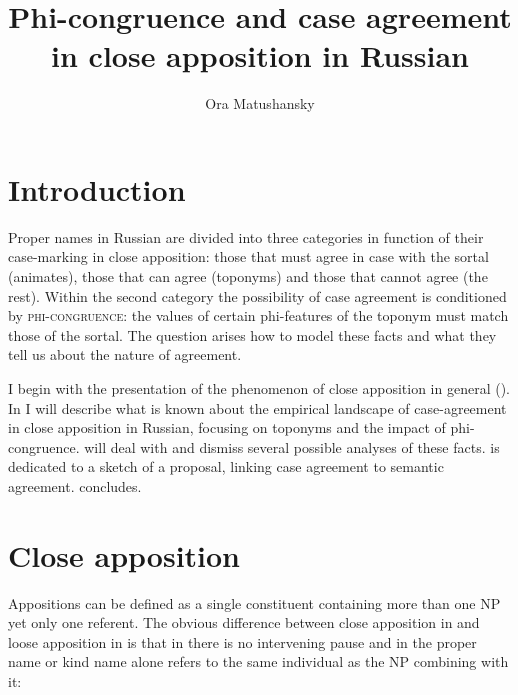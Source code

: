 \documentclass[output=paper,colorlinks,citecolor=brown]{langscibook}
\author{Ora Matushansky\affiliation{SFL (CNRS/Université Paris-8/UPL); ILS (Utrecht University)}\orcid{0000-0002-1420-7091}}
\title{Phi-congruence and case agreement in close apposition in Russian}
\begin{document}
\maketitle


\section{Introduction}\label{mat:sec:intro}

Proper names in Russian are divided into three categories in function of their case-marking in close apposition: those that must agree in case with the sortal (animates), those that can agree (toponyms) and those that cannot agree (the rest). Within the second category the possibility of case agreement is conditioned by \textsc{phi-congruence}: the values of certain phi-features of the toponym must match those of the sortal. The question arises how to model these facts and what they tell us about the nature of agreement.

I begin with the presentation of the phenomenon of close apposition in general (). In  I will describe what is known about the empirical landscape of case-agreement in close apposition in Russian, focusing on toponyms and the impact of phi-congruence.  will deal with and dismiss several possible analyses of these facts.  is dedicated to a sketch of a proposal, linking case agreement to semantic agreement.  concludes.

\section{Close apposition}\label{mat:sec:close-apposition}

Appositions can be defined as a single constituent containing more than one NP yet only one referent. The obvious difference between close apposition in  and loose apposition in  is that in  there is no intervening pause and in  the proper name or kind name alone refers to the same individual as the NP combining with it:

\ea\label{mat:ex:element-material-actor}
\label{mat:ex:element-material-actor-a}
\z
\z
\end{document}
